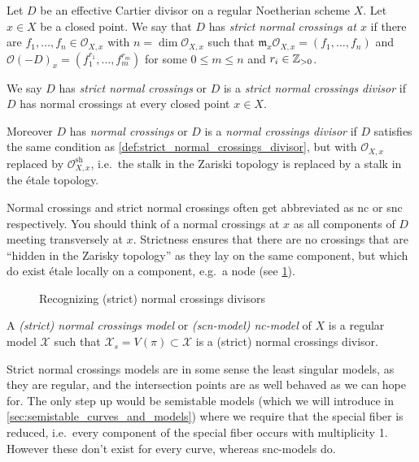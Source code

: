 \begin{definition}\label{def:strict_normal_crossings_divisor}
	Let $D$ be an effective Cartier divisor on a regular Noetherian scheme $X$. 	Let $x \in X$ be a closed point. 
	We say that $D$ has \emph{strict normal crossings at $x$ } if there are $f_1, \ldots, f_n \in \mathcal{O}_{X, x}$ with $n = \dim \mathcal{O}_{X, x}$ such that $\mathfrak{m} _x \mathcal{O}_{X, x} = (f_1, \ldots, f_n)$ and $\mathcal{O}(-D)_{x} = (f_1^{r_1}, \ldots, f_m^{r_m})$ for some $0 \le m \le n$ and $r_i \in \mathbb{Z}_{> 0}$. 

	We say $D$ has \emph{strict normal crossings} or $D$ is a \emph{strict normal crossings divisor} if $D$ has normal crossings at every closed point  $x \in X$. 

\end{definition}
\begin{definition}\label{def:normal_crossings_divisor}
	Moreover  $D$ has \emph{normal crossings} or $D$ is a \emph{normal crossings divisor} if $D$ satisfies the same condition as \cref{def:strict_normal_crossings_divisor}, but with $\mathcal{O}_{X, x}$ replaced by $\mathcal{O}_{X, x}^{\text{sh}}$, i.e.\ 
	the stalk in the Zariski topology is replaced by a stalk in the étale topology. 
\end{definition}
Normal crossings and strict normal crossings often get abbreviated as \gls{nc} or \gls{snc} respectively.
You should think of a normal crossings at $x$ as all components of $D$ meeting transversely at $x$. 
Strictness ensures that there are no crossings that are ``hidden in the Zarisky topology'' as they lay on the same component, but which do exist étale locally on a component, e.g.\ a node (see \cref{fig:normal_crossings_divisors}).

\begin{figure}[ht]
    \centering
    \caption{Recognizing (strict) normal crossings divisors}
    \label{fig:normal_crossings_divisors}
\end{figure}
\begin{definition}
	A \emph{(strict) normal crossings model} or \emph{(scn-model) nc-model}  of $X$ is a regular model $\mathscr X$ such that $\mathscr X_s = V(\pi) \subset  \mathscr X$ is a (strict) normal crossings divisor. 
\end{definition}

Strict normal crossings models are in some sense the least singular models, as they are regular, and the intersection points are as well behaved as we can hope for. 
The only step up would be semistable models (which we will introduce in \cref{sec:semistable_curves_and_models}) where we require that the special fiber is reduced, i.e.\ every component of the special fiber occurs with multiplicity 1. 
However these don't exist for every curve, whereas snc-models do.

